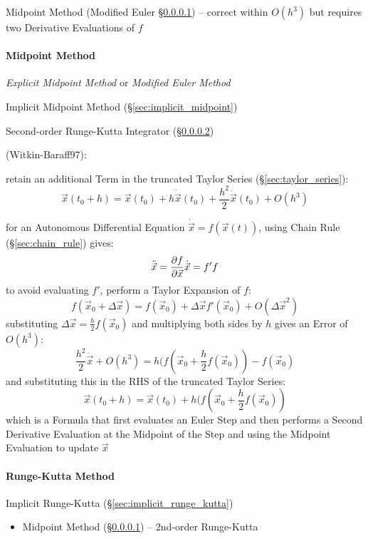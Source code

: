 Midpoint Method (Modified Euler \S\ref{sec:midpoint_method}) -- correct within
$O(h^3)$ but requires two Derivative Evaluations of $f$



\paragraph{Midpoint Method}\label{sec:midpoint_method}\hfill

\emph{Explicit Midpoint Method} or \emph{Modified Euler Method}

\fist Implicit Midpoint Method (\S\ref{sec:implicit_midpoint})

Second-order Runge-Kutta Integrator (\S\ref{sec:runge_kutta})

(Witkin-Baraff97):

retain an additional Term in the truncated Taylor Series
(\S\ref{sec:taylor_series}):
\[
  \vec{x}(t_0 + h) = \vec{x}(t_0) + h\dot{\vec{x}}(t_0) +
    \frac{h^2}{2}\ddot{\vec{x}}(t_0) + O(h^3)
\]

for an Autonomous Differential Equation $\dot{\vec{x}} = f(\vec{x}(t))$, using
Chain Rule (\S\ref{sec:chain_rule}) gives:
\[
  \ddot{\vec{x}} = \frac{\partial{f}}{\partial{\vec{x}}}\dot{\vec{x}} = f' f
\]
to avoid evaluating $f'$, perform a Taylor Expansion of $f$:
\[
  f(\vec{x}_0 + \Delta{\vec{x}}) =
    f(\vec{x}_0) + \Delta\vec{x}f'(\vec{x}_0) + O(\Delta\vec{x}^2)
\]
substituting $\Delta{\vec{x}} = \frac{h}{2} f(\vec{x}_0)$ and multiplying both
sides by $h$ gives an Error of $O(h^3)$:
\[
  \frac{h^2}{2}\ddot{\vec{x}} + O(h^3) =
    h(f(\vec{x}_0 + \frac{h}{2}f(\vec{x}_0)) - f(\vec{x}_0)
\]
and substituting this in the RHS of the truncated Taylor Series:
\[
  \vec{x}(t_0 + h) = \vec{x}(t_0) + h(f(\vec{x}_0 + \frac{h}{2}f(\vec{x}_0))
\]
which is a Formula that first evaluates an Euler Step and then performs a Second
Derivative Evaluation at the Midpoint of the Step and using the Midpoint
Evaluation to update $\vec{x}$



\paragraph{Runge-Kutta Method}\label{sec:runge_kutta}\hfill

\fist Implicit Runge-Kutta (\S\ref{sec:implicit_runge_kutta})

\begin{itemize}
  \item Midpoint Method (\S\ref{sec:midpoint_method}) -- 2nd-order Runge-Kutta
\end{itemize}



